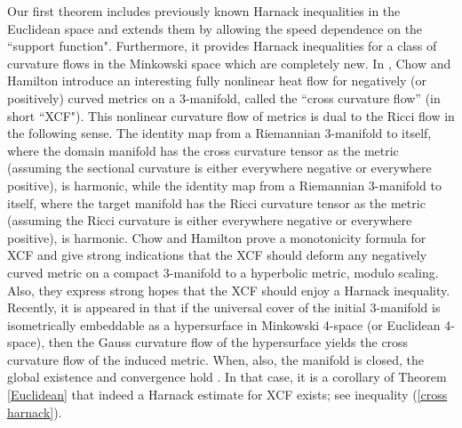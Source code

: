 Our first theorem includes previously known Harnack inequalities in the Euclidean space and extends them by allowing the speed dependence on the ``support function". Furthermore, it provides Harnack inequalities for a class of curvature flows in the Minkowski space which are completely new.
In \cite{ChowHamilton:/2004}, Chow and Hamilton introduce an interesting fully nonlinear heat flow for negatively (or positively) curved metrics on a 3-manifold, called the ``cross curvature flow'' (in short ``XCF"). This nonlinear curvature flow of metrics is dual to the Ricci flow in the following sense. The identity map from a Riemannian 3-manifold to itself, where the domain manifold has the cross curvature tensor as the metric (assuming the sectional curvature is either everywhere negative or everywhere positive), is harmonic, while the identity map from a Riemannian 3-manifold to itself, where the target manifold has the  Ricci curvature tensor as the metric (assuming the Ricci curvature is either everywhere negative or everywhere positive), is harmonic. Chow and Hamilton prove a monotonicity formula for XCF and give strong indications that the XCF should deform any negatively curved metric on a compact 3-manifold to a hyperbolic metric, modulo scaling. Also, they express strong hopes that the XCF should enjoy a Harnack inequality. Recently, it is appeared in \cite{AndrewsChenFangMcCoy:/2015} that if the universal cover of the initial 3-manifold is isometrically embeddable as a hypersurface in Minkowski 4-space (or Euclidean 4-space), then the Gauss curvature flow of the hypersurface yields the cross curvature flow of the induced metric. When, also, the manifold is closed, the global existence and convergence hold \cite{AndrewsChenFangMcCoy:/2015}. In that case, it is a corollary of Theorem \ref{Euclidean} that indeed a Harnack estimate for XCF exists; see inequality (\ref{cross harnack}).

